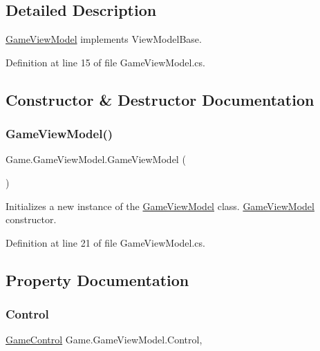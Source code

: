 \subsection{Detailed Description}
\mbox{\hyperlink{class_game_1_1_game_view_model}{Game\+View\+Model}} implements View\+Model\+Base. 



Definition at line 15 of file Game\+View\+Model.\+cs.



\subsection{Constructor \& Destructor Documentation}
\mbox{\label{class_game_1_1_game_view_model_a72f7732fb477a7b5bc78cf70e6fc56a6}} 
\subsubsection{\texorpdfstring{GameViewModel()}{GameViewModel()}}
{\footnotesize\ttfamily Game.\+Game\+View\+Model.\+Game\+View\+Model (\begin{DoxyParamCaption}{ }\end{DoxyParamCaption})}



Initializes a new instance of the \mbox{\hyperlink{class_game_1_1_game_view_model}{Game\+View\+Model}} class. \mbox{\hyperlink{class_game_1_1_game_view_model}{Game\+View\+Model}} constructor. 



Definition at line 21 of file Game\+View\+Model.\+cs.



\subsection{Property Documentation}
\mbox{\label{class_game_1_1_game_view_model_a2a9adca6708f57e91ede1202afeafd9d}} 
\subsubsection{\texorpdfstring{Control}{Control}}
{\footnotesize\ttfamily \mbox{\hyperlink{class_game_1_1_game_control}{Game\+Control}} Game.\+Game\+View\+Model.\+Control\hspace{0.3cm}{\ttfamily [get]}, {\ttfamily [set]}}



